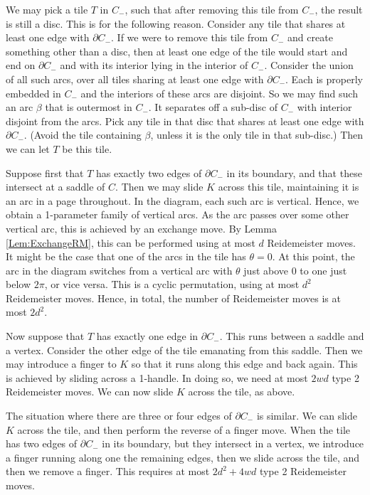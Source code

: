\documentclass[oneside]{amsart}
\numberwithin{equation}{section}
\theoremstyle{plain}
\theoremstyle{definition}
\begin{document}
We may pick a tile $T$ in $C_-$, such that after removing this tile from $C_-$, the result
is still a disc. This is for the following reason. Consider any tile that shares at least one edge with $\partial C_-$.
If we were to remove this tile from $C_-$ and create something other than a disc, then at least one edge
of the tile would start and end on $\partial C_-$ and with its interior lying in the interior of $C_-$.
Consider the union of all such arcs, over all tiles
sharing at least one edge with $\partial C_-$. Each is properly embedded in $C_-$ and the interiors
of these arcs are disjoint. So we may find such an arc $\beta$ that is outermost in $C_-$. It separates off
a sub-disc of $C_-$ with interior disjoint from the arcs. Pick any tile in that disc that shares at least
one edge with $\partial C_-$. (Avoid the tile containing $\beta$, unless it is the only tile in that sub-disc.)
Then we can let $T$ be this tile.

Suppose first that $T$ has exactly two edges of $\partial C_-$ in its boundary, and that these intersect
at a saddle of $C$. Then we may slide $K$ across this tile, maintaining it is an arc in a page throughout.
In the diagram, each such arc is vertical. Hence, we obtain a 1-parameter family of vertical arcs.
As the arc passes over some other vertical arc, this is achieved by an exchange move.
By Lemma \ref{Lem:ExchangeRM}, this can be performed using at most $d$ Reidemeister moves. It might be
the case that one of the arcs in the tile has $\theta = 0$. At this point, the arc in the diagram 
switches from a vertical arc with $\theta$ just above $0$ to one just below $2\pi$, or vice versa. This is
a cyclic permutation, using at most $d^2$ Reidemeister moves. Hence, in total, the number of
Reidemeister moves is at most $2d^2$.

Now suppose that $T$ has exactly one edge in $\partial C_-$. This runs between a saddle and a vertex.
Consider the other edge of the tile emanating from this saddle. Then we may introduce a finger to $K$
so that it runs along this edge and back again. This is achieved by sliding across a 1-handle.
In doing so, we need at most $2wd$ type 2 Reidemeister moves.
We can now slide $K$ across the tile, as above.

The situation where there are three or four edges of $\partial C_-$ is similar. We can slide $K$ across the
tile, and then perform the reverse of a finger move. When the tile has two edges of $\partial C_-$ in its
boundary, but they intersect in a vertex, we introduce a finger running along one the remaining edges,
then we slide across the tile, and then we remove a finger. This requires at most $2d^2 + 4wd$ type 2 Reidemeister moves.
\end{document}
